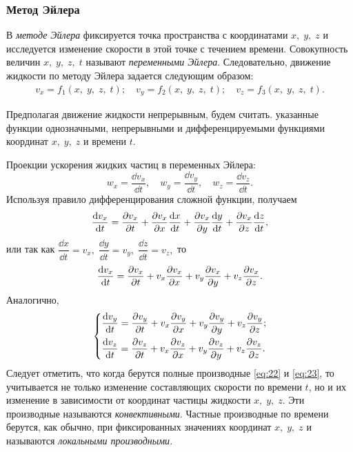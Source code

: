 	\subsubsection{Метод Эйлера}
	В \textit{методе Эйлера} фиксируется точка пространства с координатами $x,\;y,\;z$ и исследуется изменение скорости в этой точке с течением времени. Совокупность величин $x,\;y,\;z,\;t$ называют \textit{переменными Эйлера}. Следовательно, движение жидкости по методу Эйлера задается следующим образом:
	\begin{gather}
		v_x = f_1(x,\;y,\;z,\;t);\quad v_y = f_2(x,\;y,\;z,\;t);\quad v_z = f_3(x,\;y,\;z,\;t).
	\end{gather}\par
	Предполагая движение жидкости непрерывным, будем считать. указанные функции однозначными, непрерывными и дифференцируемыми функциями координат $x,\;y,\;z$ и времени $t$.\par
	Проекции ускорения жидких частиц в переменных Эйлера:
	\[ w_x = \frac{\dd v_x}{\dd t},\quad w_y = \frac{\dd v_y}{\dd t},\quad w_z = \frac{\dd v_z}{\dd t}. \]\n
	Используя правило дифференцирования сложной функции, получаем
	\[ \frac{\mathrm{d}v_x}{\mathrm{d}t} = \frac{\partial v_x}{\partial t} + \frac{\partial v_x}{\partial x}\frac{\mathrm{d} x}{\mathrm{d} t} + \frac{\partial v_x}{\partial y}\frac{\mathrm{d} y}{\mathrm{d} t} + \frac{\partial v_x}{\partial z}\frac{\mathrm{d} z}{\mathrm{d} t}, \]
	или так как $\dfrac{\dd x}{\dd t}=v_x,\; \dfrac{\dd y}{\dd t}=v_y,\; \dfrac{\dd z}{\dd t}=v_z,$ то
	\begin{gather}
		\frac{\mathrm{d} v_x}{\mathrm{d} t} = \frac{\partial v_x}{\partial t} + v_x\frac{\partial v_x}{\partial x} + v_y\frac{\partial v_x}{\partial y} + v_z\frac{\partial v_x}{\partial z}.\label{eq:22}
	\end{gather}\n
	Аналогично,
	\begin{gather}
		\begin{dcases}\label{eq:23}
			\frac{\mathrm{d} v_y}{\mathrm{d} t} = \frac{\partial v_y}{\partial t} + v_x\frac{\partial v_y}{\partial x} + v_y\frac{\partial v_y}{\partial y} + v_z\frac{\partial v_y}{\partial z};\\
			\frac{\mathrm{d} v_z}{\mathrm{d} t} = \frac{\partial v_z}{\partial t} + v_x\frac{\partial v_z}{\partial x} + v_y\frac{\partial v_z}{\partial y} + v_z\frac{\partial v_z}{\partial z}.
		\end{dcases}
	\end{gather}\n
	Следует отметить, что когда берутся полные производные \eqref{eq:22} и \eqref{eq:23}, то учитывается не только изменение составляющих скорости по времени $t$, но и их изменение в зависимости от координат частицы жидкости $x,\; y,\; z$. Эти производные называются \textit{конвективными}. Частные производные по времени берутся, как обычно, при фиксированных значениях координат $x,\; y,\; z$ и называются \textit{локальными производными}.\n
	
